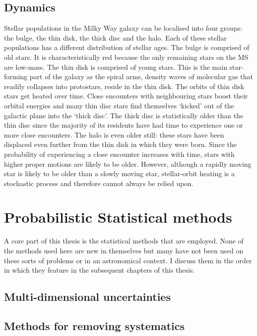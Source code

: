 \subsection{Dynamics}
Stellar populations in the Milky Way galaxy can be localised into four groups:
the bulge, the thin disk, the thick disc and the halo.
Each of these stellar populations has a different distribution of stellar
ages.
The bulge is comprised of old stars.
It is characteristically red because the only remaining stars on the MS are
low-mass.
The thin disk is comprised of young stars.
This is the main star-forming part of the galaxy as the spiral arms, density
waves of molecular gas that readily collapses into protostars, reside in the
thin disk.
The orbits of thin disk stars get heated over time.
Close encounters with neighbouring stars boost their orbital energies and many
thin disc stars find themselves `kicked' out of the galactic plane into the
`thick disc'.
The thick disc is statistically older than the thin disc since the majority of
its residents have had time to experience one or more close encounters.
The halo is even older still: these stars have been displaced even further
from the thin disk in which they were born.
Since the probability of experiencing a close encounter increases with time,
stars with higher proper motions are likely to be older.
However, although a rapidly moving star is likely to be older than a slowly
moving star, stellar-orbit heating is a stochastic process and therefore
cannot always be relied upon.

\section{Probabilistic Statistical methods}

A core part of this thesis is the statistical methods that are employed.
None of the methods used here are new in themselves but many have not been
used on these sorts of problems or in an astronomical context.
I discuss them in the order in which they feature in the subsequent chapters
of this thesis.

\subsection{Multi-dimensional uncertainties}

\subsection{Methods for removing systematics}
\label{sec:detrending}

